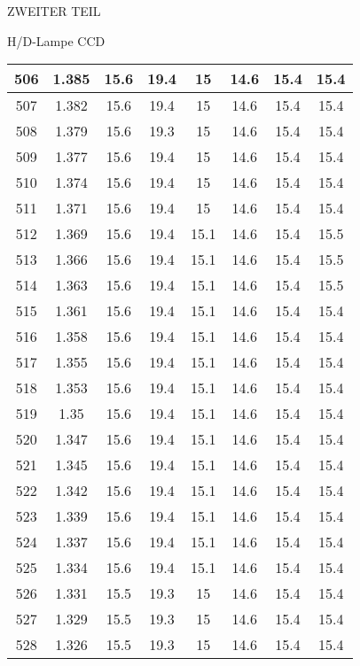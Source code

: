 \begin{appendix}
\begin{chapter}{ZWEITER TEIL}
\begin{section}{H/D-Lampe CCD}
\begin{scriptsize}
\begin{longtable}[htbp]{|c|c|c|c|c|c|c|c|}
            506 & 1.385 & 15.6 & 19.4 & 15 & 14.6 & 15.4 & 15.4 \\ \hline
            507 & 1.382 & 15.6 & 19.4 & 15 & 14.6 & 15.4 & 15.4 \\ \hline
            508 & 1.379 & 15.6 & 19.3 & 15 & 14.6 & 15.4 & 15.4 \\ \hline
            509 & 1.377 & 15.6 & 19.4 & 15 & 14.6 & 15.4 & 15.4 \\ \hline
            510 & 1.374 & 15.6 & 19.4 & 15 & 14.6 & 15.4 & 15.4 \\ \hline
            511 & 1.371 & 15.6 & 19.4 & 15 & 14.6 & 15.4 & 15.4 \\ \hline
            512 & 1.369 & 15.6 & 19.4 & 15.1 & 14.6 & 15.4 & 15.5 \\ \hline
            513 & 1.366 & 15.6 & 19.4 & 15.1 & 14.6 & 15.4 & 15.5 \\ \hline
            514 & 1.363 & 15.6 & 19.4 & 15.1 & 14.6 & 15.4 & 15.5 \\ \hline
            515 & 1.361 & 15.6 & 19.4 & 15.1 & 14.6 & 15.4 & 15.4 \\ \hline
            516 & 1.358 & 15.6 & 19.4 & 15.1 & 14.6 & 15.4 & 15.4 \\ \hline
            517 & 1.355 & 15.6 & 19.4 & 15.1 & 14.6 & 15.4 & 15.4 \\ \hline
            518 & 1.353 & 15.6 & 19.4 & 15.1 & 14.6 & 15.4 & 15.4 \\ \hline
            519 & 1.35 & 15.6 & 19.4 & 15.1 & 14.6 & 15.4 & 15.4 \\ \hline
            520 & 1.347 & 15.6 & 19.4 & 15.1 & 14.6 & 15.4 & 15.4 \\ \hline
            521 & 1.345 & 15.6 & 19.4 & 15.1 & 14.6 & 15.4 & 15.4 \\ \hline
            522 & 1.342 & 15.6 & 19.4 & 15.1 & 14.6 & 15.4 & 15.4 \\ \hline
            523 & 1.339 & 15.6 & 19.4 & 15.1 & 14.6 & 15.4 & 15.4 \\ \hline
            524 & 1.337 & 15.6 & 19.4 & 15.1 & 14.6 & 15.4 & 15.4 \\ \hline
            525 & 1.334 & 15.6 & 19.4 & 15.1 & 14.6 & 15.4 & 15.4 \\ \hline
            526 & 1.331 & 15.5 & 19.3 & 15 & 14.6 & 15.4 & 15.4 \\ \hline
            527 & 1.329 & 15.5 & 19.3 & 15 & 14.6 & 15.4 & 15.4 \\ \hline
            528 & 1.326 & 15.5 & 19.3 & 15 & 14.6 & 15.4 & 15.4 \\ \hline

\end{longtable}
\end{scriptsize}
\end{section}
\end{chapter}
\end{appendix}
